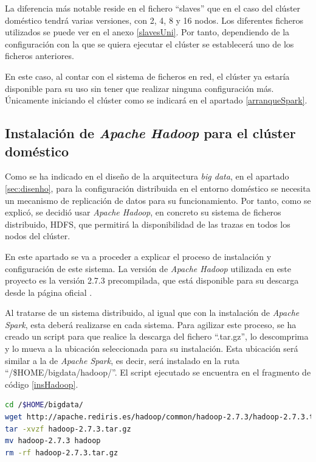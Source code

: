 La diferencia más notable reside en el fichero ``slaves'' que en el caso del clúster doméstico tendrá varias versiones, con 2, 4, 8 y 16 nodos. Los diferentes ficheros utilizados se puede ver en el anexo \ref{slavesUni}. Por tanto, dependiendo de la configuración con la que se quiera ejecutar el clúster se establecerá uno de los ficheros anteriores.

En este caso, al contar con el sistema de ficheros en red, el clúster ya estaría disponible para su uso sin tener que realizar ninguna configuración más. Únicamente iniciando el clúster como se indicará en el apartado \ref{arranqueSpark}.

\subsection{Instalación de \textit{Apache Hadoop} para el clúster doméstico \label{hadoopClusterDom}}
Como se ha indicado en el diseño de la arquitectura \textit{big data}, en el apartado \ref{sec:disenho}, para la configuración distribuida en el entorno doméstico se necesita un mecanismo de replicación de datos para su funcionamiento. Por tanto, como se explicó, se decidió usar \textit{Apache Hadoop}, en concreto su sistema de ficheros distribuido, \gls{HDFS}, que permitirá la disponibilidad de las trazas en todos los nodos del clúster.

En este apartado se va a proceder a explicar el proceso de instalación y configuración de este sistema. La versión de \textit{Apache Hadoop} utilizada en este proyecto es la versión 2.7.3 precompilada, que está disponible para su descarga desde la página oficial \cite{descHadoop}.

Al tratarse de un sistema distribuido, al igual que con la instalación de \textit{Apache Spark}, esta deberá realizarse en cada sistema. Para agilizar este proceso, se ha creado un script para que realice la descarga del fichero ``.tar.gz'', lo descomprima y lo mueva a la ubicación seleccionada para su instalación. Esta ubicación será similar a la de \textit{Apache Spark}, es decir, será instalado en la ruta ``/\$HOME/bigdata/hadoop/''. El script ejecutado se encuentra en el fragmento de código \ref{insHadoop}.

\begin{lstlisting}[label=insHadoop,language=sh,frame=single,caption=Script de instalación de \textit{Apache Hadoop} en los nodos del clúster doméstico]
cd /$HOME/bigdata/
wget http://apache.rediris.es/hadoop/common/hadoop-2.7.3/hadoop-2.7.3.tar.gz
tar -xvzf hadoop-2.7.3.tar.gz
mv hadoop-2.7.3 hadoop
rm -rf hadoop-2.7.3.tar.gz
\end{lstlisting}

